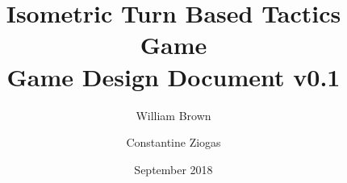 \documentclass{article}
\title{Isometric Turn Based Tactics Game\\
       \large Game Design Document v0.1}
\author{William Brown \and Constantine Ziogas}
\date{September 2018}
\begin{document}
    \begin{titlepage}
        \maketitle
        \thispagestyle{empty}
    \end{titlepage}
    \newpage
    
    \tableofcontents
    \label{toc-contents}
    \newpage
    
    
    
    
    
    
    
    
    
    
    
    
    
\end{document}
